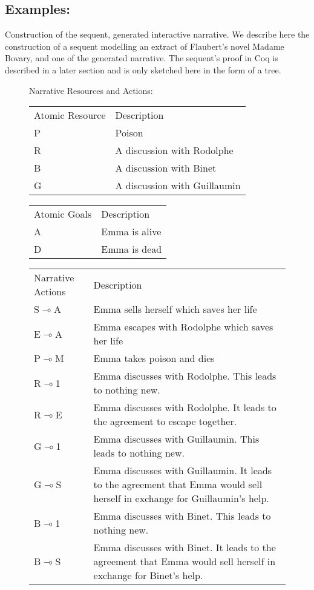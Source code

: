 \documentclass[runningheads,a4paper]{llncs}
\begin{document}
\subsection{Examples:} Construction of the sequent, generated interactive narrative.
We describe here the construction of a sequent modelling an extract of Flaubert's novel Madame Bovary, and one of the generated narrative. The sequent's proof in Coq is described in a later section and is only sketched here in the form of a tree.
\begin{figure}
Narrative Resources and Actions:

\vspace{0.1in}
\begin{tabular} {|l|l|}
\hline
Atomic Resource & Description\\
P      & Poison\\
R      & A discussion with Rodolphe\\
B      & A discussion with Binet\\
G      & A discussion with Guillaumin\\
\hline
\end{tabular}
\begin{tabular}{|l|l|}
\hline
Atomic Goals  & Description\\
A     & Emma is alive\\
D     & Emma is dead\\
\hline
\end{tabular}

\vspace{0.1in}
\begin{tabular}{|p{}|p{}|}
\hline
Narrative Actions & Description\\
S$\multimap$A & Emma sells herself which saves her life\\
E$\multimap$A & Emma escapes with Rodolphe which saves her life\\
P$\multimap$M & Emma takes poison and dies\\ 
R$\multimap$1 & Emma discusses with Rodolphe. This leads to nothing new.\\
R$\multimap$E & Emma discusses with Rodolphe. It leads to the agreement to escape together.\\
G$\multimap$1 & Emma discusses with Guillaumin. This leads to nothing new.\\
G$\multimap$S & Emma discusses with Guillaumin. It leads to the agreement that Emma would sell herself in exchange for Guillaumin's help.\\
B$\multimap$1 & Emma discusses with Binet. This leads to nothing new.\\
B$\multimap$S & Emma discusses with Binet. It leads to the agreement that Emma would sell herself in exchange for Binet's help.\\
\hline
\end{tabular}


\end{figure}
\end{document}
